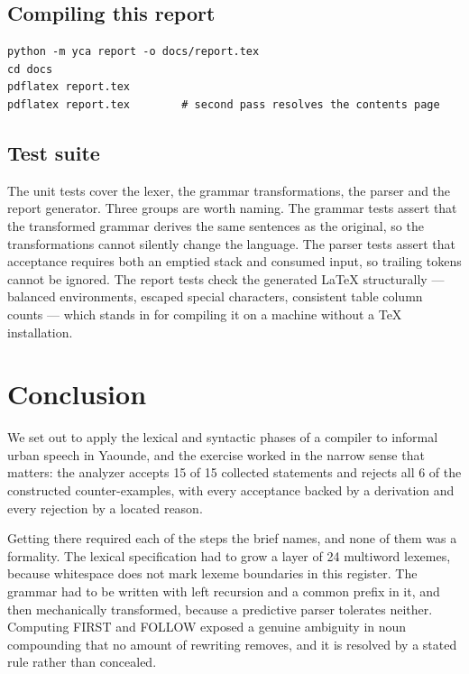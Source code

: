 \documentclass[11pt,a4paper]{article}
\newcommand{\vbfmt}{\color{ink!88}}
\begin{document}
\subsection{Compiling this report}
\begin{Verbatim}[commandchars=\\\{\},fontsize=\small,formatcom=\vbfmt,frame=leftline,framerule=1.2pt,rulecolor=\color{clay!55},framesep=6pt,xleftmargin=10pt,xrightmargin=4pt]
python -m yca report -o docs/report.tex
cd docs
pdflatex report.tex
pdflatex report.tex        # second pass resolves the contents page
\end{Verbatim}
\subsection{Test suite}
The unit tests cover the lexer, the grammar transformations, the parser and the report generator. Three groups are worth naming. The grammar tests assert that the transformed grammar derives the same sentences as the original, so the transformations cannot silently change the language. The parser tests assert that acceptance requires both an emptied stack and consumed input, so trailing tokens cannot be ignored. The report tests check the generated LaTeX structurally --- balanced environments, escaped special characters, consistent table column counts --- which stands in for compiling it on a machine without a TeX installation.

\section{Conclusion}
\label{sec:conclusion}
We set out to apply the lexical and syntactic phases of a compiler to informal urban speech in Yaounde, and the exercise worked in the narrow sense that matters: the analyzer accepts 15 of 15 collected statements and rejects all 6 of the constructed counter-examples, with every acceptance backed by a derivation and every rejection by a located reason.

Getting there required each of the steps the brief names, and none of them was a formality. The lexical specification had to grow a layer of 24 multiword lexemes, because whitespace does not mark lexeme boundaries in this register. The grammar had to be written with left recursion and a common prefix in it, and then mechanically transformed, because a predictive parser tolerates neither. Computing FIRST and FOLLOW exposed a genuine ambiguity in noun compounding that no amount of rewriting removes, and it is resolved by a stated rule rather than concealed.
\end{document}
